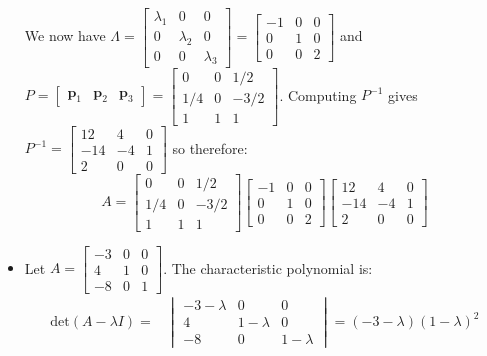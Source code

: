 \documentclass{article}
\begin{document}
\begin{itemize}
We now have \(\Lambda = \begin{bmatrix} \lambda_1 & 0 & 0 \\ 0 & \lambda_2 & 0 \\ 0 & 0 & \lambda_3 \end{bmatrix} = \begin{bmatrix} -1 & 0 & 0 \\ 0 & 1 & 0 \\ 0 & 0 & 2 \end{bmatrix}\) and \(P = \begin{bmatrix} \mathbf{p}_1 & \mathbf{p}_2 & \mathbf{p}_3 \end{bmatrix} = \begin{bmatrix} 0 & 0 & 1/2 \\ 1/4 & 0 & -3/2 \\ 1 & 1 & 1 \end{bmatrix}\). Computing \(P^{-1}\) gives \(P^{-1} = \begin{bmatrix} 12 & 4 & 0 \\ -14 & -4 & 1 \\ 2 & 0 & 0 \end{bmatrix}\) so therefore:
\[A = \begin{bmatrix} 0 & 0 & 1/2 \\ 1/4 & 0 & -3/2 \\ 1 & 1 & 1 \end{bmatrix}\begin{bmatrix} -1 & 0 & 0 \\ 0 & 1 & 0 \\ 0 & 0 & 2 \end{bmatrix}\begin{bmatrix} 12 & 4 & 0 \\ -14 & -4 & 1 \\ 2 & 0 & 0 \end{bmatrix}\]
\item Let \(A = \begin{bmatrix} -3 & 0 & 0 \\ 4 & 1 & 0 \\ -8 & 0 & 1 \end{bmatrix}\). The characteristic polynomial is:
\begin{align*}
\text{det}(A - \lambda I) = & \begin{vmatrix}
-3 - \lambda & 0 & 0 \\ 
4 & 1 - \lambda & 0 \\ 
-8 & 0 & 1 - \lambda
\end{vmatrix} = (-3 - \lambda)(1 - \lambda)^2

\end{align*}
\end{itemize}
\end{document}
